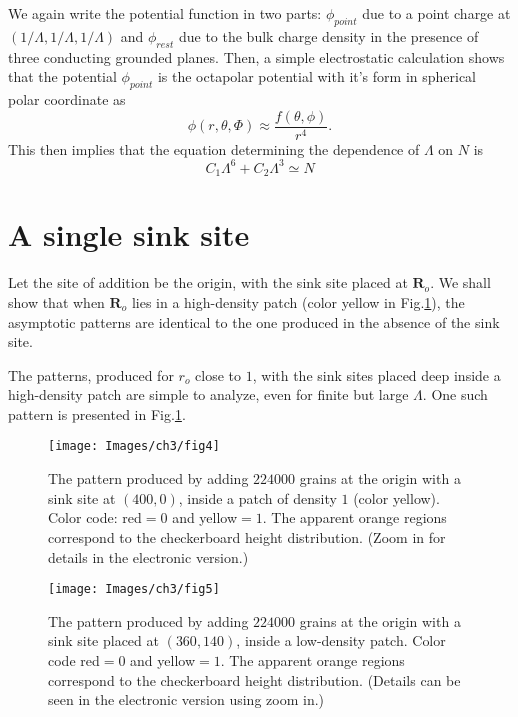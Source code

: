 \documentclass[11pt,a4paper]{book}
\begin{document}
We again write the potential function in two parts: $\phi_{point}$ due to a point charge at 
$\left( 1/\Lambda,1/\Lambda,1/\Lambda \right)$ and $\phi_{rest}$ due to the bulk charge density in the presence
of three conducting grounded planes. Then, a simple electrostatic
calculation shows that the potential $\phi_{point}$ is the octapolar
potential with it's form in spherical polar coordinate as
\begin{equation}
\phi\left( r, \theta, \Phi \right)\approx \frac{f\left( \theta,\phi \right)}{r^{4}}.
\label{octupole}
\end{equation}
This then implies that the equation determining the dependence
of $\Lambda$ on $N$ is
\begin{equation}
C_{1}\Lambda^{6}+C_{2}\Lambda^{3}\simeq N
\label{scalefive}
\end{equation}




\section{A single sink site}\label{ch3.3}
Let the site of addition be the origin, with the sink site placed at $\mathbf{R}_{o}$.
We shall show that when  $\mathbf{R}_{o}$ lies in a high-density patch (color yellow in
Fig.\ref{fig:psone}), the asymptotic patterns are identical to the one
produced in the absence of the sink site.

The patterns, produced for $r_{o}$ close to $1$, with the sink sites placed deep inside 
a high-density patch are simple to analyze, even for finite but large $\Lambda$. One such pattern
is presented in Fig.\ref{fig:psone}. 
\begin{figure}
\begin{center}
\texttt{[image: Images/ch3/fig4]}
\caption{ The pattern produced by adding $224000$ grains at the origin
with a sink site at $\left( 400,0 \right)$, inside a patch of density $1$ (color yellow). Color code: red$=0$ and
yellow$=1$. The apparent orange regions correspond to the checkerboard height distribution. (Zoom in for details in the electronic version.)}
\label{fig:psone}
\end{center}
\end{figure}
\begin{figure}[t]
\begin{center}
\texttt{[image: Images/ch3/fig5]}
\caption{ The pattern produced by adding $224000$ grains at the origin
with a sink site placed at $\left( 360,140 \right)$, inside a low-density patch. 
Color code red$=0$ and
yellow$=1$. The apparent orange regions correspond to the checkerboard height distribution. (Details can be seen in the electronic version using zoom in.)}
\label{fig:pstwo}
\end{center}
\end{figure}
\end{document}
